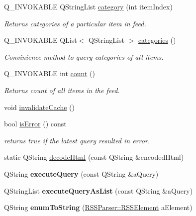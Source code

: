 \begin{DoxyCompactItemize}
\item 
Q\-\_\-\-I\-N\-V\-O\-K\-A\-B\-L\-E Q\-String\-List \hyperlink{class_r_s_s_parser_a207fae9001e240065c2d600d3638ce89}{category} (int item\-Index)
\begin{DoxyCompactList}\small\item\em Returns categories of a particular item in feed. \end{DoxyCompactList}\item 
Q\-\_\-\-I\-N\-V\-O\-K\-A\-B\-L\-E Q\-List$<$ Q\-String\-List $>$ \hyperlink{class_r_s_s_parser_ab9398ef4aea9f70266590998c232f9a8}{categories} ()
\begin{DoxyCompactList}\small\item\em Convinience method to query categories of all items. \end{DoxyCompactList}\item 
Q\-\_\-\-I\-N\-V\-O\-K\-A\-B\-L\-E int \hyperlink{class_r_s_s_parser_a0c492d66b7680715c9f9fac92a3c06c5}{count} ()
\begin{DoxyCompactList}\small\item\em Returns count of all items in the feed. \end{DoxyCompactList}\item 
void \hyperlink{class_r_s_s_parser_ac6e01abe6e0e849c3f9ee327b31cfd40}{invalidate\-Cache} ()
\item 
\hypertarget{class_r_s_s_parser_a2565557c7f7d5b348a4c2137d6916fcb}{bool \hyperlink{class_r_s_s_parser_a2565557c7f7d5b348a4c2137d6916fcb}{is\-Error} () const }\label{class_r_s_s_parser_a2565557c7f7d5b348a4c2137d6916fcb}

\begin{DoxyCompactList}\small\item\em returns true if the latest query resulted in error. \end{DoxyCompactList}\item 
static Q\-String \hyperlink{class_r_s_s_parser_ab88730a31215283d223cd509fd172f54}{decode\-Html} (const Q\-String \&encoded\-Html)
\item 
\hypertarget{class_r_s_s_parser_aee520755a65761ee2804921a9ce1dc33}{Q\-String {\bfseries execute\-Query} (const Q\-String \&a\-Query)}\label{class_r_s_s_parser_aee520755a65761ee2804921a9ce1dc33}

\item 
\hypertarget{class_r_s_s_parser_afa2ea2c5c5e123383bc9e958c7adfa3c}{Q\-String\-List {\bfseries execute\-Query\-As\-List} (const Q\-String \&a\-Query)}\label{class_r_s_s_parser_afa2ea2c5c5e123383bc9e958c7adfa3c}

\item 
\hypertarget{class_r_s_s_parser_a983707ca1ea33a9bc84c71163c3f3ddb}{Q\-String {\bfseries enum\-To\-String} (\hyperlink{class_r_s_s_parser_a7abe04d86afbba935a94443444685310}{R\-S\-S\-Parser\-::\-R\-S\-S\-Element} a\-Element)}\label{class_r_s_s_parser_a983707ca1ea33a9bc84c71163c3f3ddb}

\end{DoxyCompactItemize}
